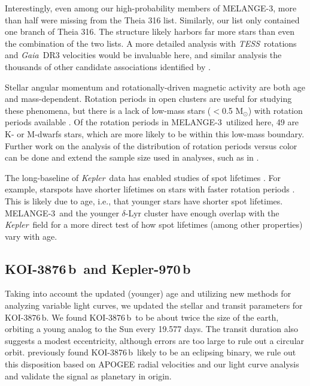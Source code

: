 \documentclass[twocolumn, linenumbers]{aastex631}
\newcommand{\association}{MELANGE-3}
\newcommand{\planetname}{KOI-3876\,b}
\newcommand{\planetnametwo}{Kepler-970\,b}
\newcommand{\kepler}{{\it Kepler}}
\newcommand{\tess}{\textit{TESS}}
\newcommand{\gaia}{\textit{Gaia}}
\begin{document}
Interestingly, even among our high-probability members of \association, more than half were missing from the Theia 316 list. Similarly, our list only contained one branch of Theia 316. The structure likely harbors far more stars than even the combination of the two lists. A more detailed analysis with \tess\ rotations and \gaia\ DR3 velocities would be invaluable here, and similar analysis the thousands of other candidate associations identified by \citet{2020AJ....160..279K}.

Stellar angular momentum and rotationally-driven magnetic activity are both age and mass-dependent. Rotation periods in open clusters are useful for studying these phenomena, but there is a lack of low-mass stars ($<$0.5 M$_\odot$) with rotation periods available \citep{Covey2016}. Of the rotation periods in \association\ utilized here, 49 are K- or M-dwarfs stars, which are more likely to be within this low-mass boundary. Further work on the analysis of the distribution of rotation periods versus color can be done and extend the sample size used in analyses, such as in \citet{2016AJ....152..114R}. 

The long-baseline of \kepler\ data has enabled studies of spot lifetimes \citep[e.g.,][]{2017MNRAS.472.1618G}. For example, starspots have shorter lifetimes on stars with faster rotation periods \citep{2022ApJ...924...31B}. This is likely due to age, i.e., that younger stars have shorter spot lifetimes.  \association\ and the younger $\delta$-Lyr cluster \citep{2021arXiv211214776B} have enough overlap with the \kepler\ field for a more direct test of how spot lifetimes (among other properties) vary with age. 

\subsection{\planetname\ and \planetnametwo}
Taking into account the updated (younger) age and utilizing new methods for analyzing variable light curves, we updated the stellar and transit parameters for \planetname. We found \planetname\ to be about twice the size of the earth, orbiting a young analog to the Sun every 19.577 days. The transit duration also suggests a modest eccentricity, although errors are too large to rule out a circular orbit. \citet{2016ApJ...822...86M} previously found \planetname\ likely to be an eclipsing binary, we rule out this disposition based on APOGEE radial velocities and our light curve analysis and validate the signal as planetary in origin. %
\end{document}
